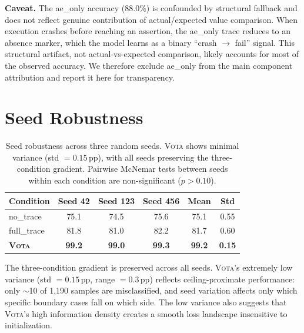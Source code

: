 \documentclass[11pt,a4paper]{article}
\newcommand{\vota}{\textsc{Vota}}
\newcommand{\pp}{\,\text{pp}}
\begin{document}
\noindent\textbf{Caveat.}
The ae\_only accuracy (88.0\%) is confounded by structural fallback and does not reflect genuine contribution of actual/expected value comparison.
When execution crashes before reaching an assertion, the ae\_only trace reduces to an absence marker, which the model learns as a binary ``crash $\to$ fail'' signal.
This structural artifact, not actual-vs-expected comparison, likely accounts for most of the observed accuracy.
We therefore exclude ae\_only from the main component attribution and report it here for transparency.

\section{Seed Robustness}
\label{app:seeds}

\begin{table}[h]
\centering
\small
\begin{tabular}{lccccc}
\toprule
\textbf{Condition} & \textbf{Seed 42} & \textbf{Seed 123} & \textbf{Seed 456} & \textbf{Mean} & \textbf{Std} \\
\midrule
no\_trace & 75.1 & 74.5 & 75.6 & 75.1 & 0.55 \\
full\_trace & 81.8 & 81.0 & 82.2 & 81.7 & 0.60 \\
\textbf{\vota{}} & \textbf{99.2} & \textbf{99.0} & \textbf{99.3} & \textbf{99.2} & \textbf{0.15} \\
\bottomrule
\end{tabular}
\caption{Seed robustness across three random seeds. \vota{} shows minimal variance (std $= 0.15\pp$), with all seeds preserving the three-condition gradient. Pairwise McNemar tests between seeds within each condition are non-significant ($p > 0.10$).}
\label{tab:seeds}
\end{table}

\noindent The three-condition gradient is preserved across all seeds.
\vota{}'s extremely low variance (std $= 0.15\pp$, range $= 0.3\pp$) reflects ceiling-proximate performance: only $\sim$10 of 1{,}190 samples are misclassified, and seed variation affects only which specific boundary cases fall on which side.
The low variance also suggests that \vota{}'s high information density creates a smooth loss landscape insensitive to initialization.
\end{document}
